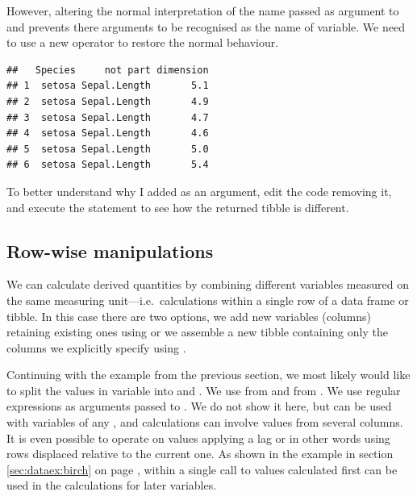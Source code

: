 \documentclass[krantz2]{krantz}\usepackage{knitr}%
\begin{document}
\begin{warningbox}
However, altering the normal interpretation of the name passed as argument to  and  prevents there arguments to be recognised as the name of variable. We need to use a new operator \code{!!} to restore the normal \Rlang behaviour.
\begin{knitrout}\footnotesize
{}\color{fgcolor}\begin{kframe}
\begin{alltt}
 \hlkwb{<-} 
 \hlkwb{<-}   \hlstd{=} \hlopt{!!}   \hlopt{-}
\end{alltt}
\begin{verbatim}
##   Species     not part dimension
## 1  setosa Sepal.Length       5.1
## 2  setosa Sepal.Length       4.9
## 3  setosa Sepal.Length       4.7
## 4  setosa Sepal.Length       4.6
## 5  setosa Sepal.Length       5.0
## 6  setosa Sepal.Length       5.4
\end{verbatim}
\end{kframe}
\end{knitrout}
\end{warningbox}

\begin{playground}
To better understand why I added  as an argument, edit the code removing it, and execute the statement to see how the returned tibble is different.
\end{playground}

\subsection{Row-wise manipulations}

We can calculate derived quantities by combining different variables measured on the same measuring unit---i.e.\ calculations within a single row of a data frame or tibble. In this case there are two options, we add new variables (columns) retaining existing ones using  or we assemble a new tibble containing only the columns we explicitly specify using .

Continuing with the example from the previous section, we most likely would like to split the values in variable  into  and . We use  from  and  from . We use regular expressions as arguments passed to .  We do not show it here, but  can be used with variables of any , and calculations can involve values from several columns. It is even possible to operate on values applying a lag or in other words using rows displaced relative to the current one. As shown in the example in section \ref{sec:dataex:birch} on page \pageref{sec:dataex:birch}, within a single call to  values calculated first can be used in the calculations for later variables.
\end{document}
